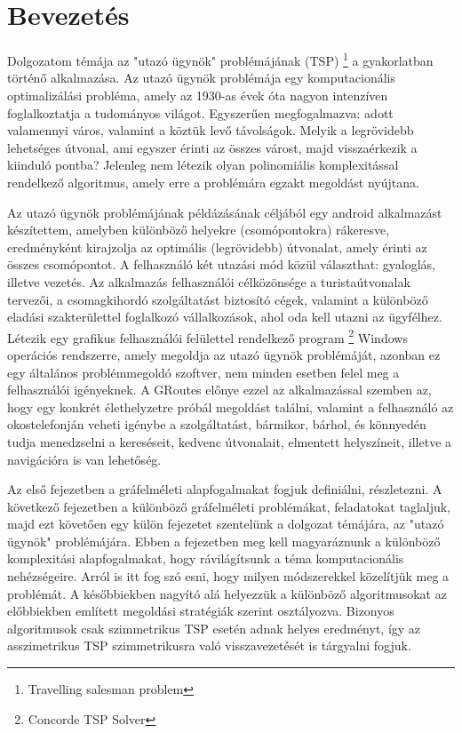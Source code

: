 \chapter{Bevezetés}

Dolgozatom témája az "utazó ügynök" problémájának (TSP)%
\footnote{ %
	Travelling salesman problem
}  %
 a gyakorlatban történő alkalmazása. Az utazó ügynök problémája egy komputacionális optimalizálási probléma, amely az 1930-as évek óta nagyon intenzíven foglalkoztatja a tudományos világot. Egyszerűen megfogalmazva: adott valamennyi város, valamint a köztük levő távolságok. Melyik a legrövidebb lehetséges útvonal, ami egyszer érinti az összes várost, majd visszaérkezik a kiinduló pontba? Jelenleg nem létezik olyan polinomiális komplexitással rendelkező algoritmus, amely erre a problémára egzakt megoldást nyújtana.

Az utazó ügynök problémájának példázásának céljából egy android alkalmazást készítettem, amelyben különböző helyekre (csomópontokra) rákeresve, eredményként kirajzolja az optimális (legrövidebb) útvonalat, amely érinti az összes csomópontot. A felhasználó két utazási mód közül választhat: gyaloglás, illetve vezetés. Az alkalmazás felhasználói célközönsége a turistaútvonalak tervezői, a csomagkihordó szolgáltatást biztosító cégek, valamint a különböző eladási szakterülettel foglalkozó vállalkozások, ahol oda kell utazni az ügyfélhez. Létezik egy grafikus felhasználói felülettel rendelkező program%
\footnote{ %
	Concorde TSP Solver
}  %
 Windows operációs rendszerre, amely megoldja az utazó ügynök problémáját, azonban ez egy általános problémmegoldó szoftver, nem minden esetben felel meg a felhasználói igényeknek. A GRoutes előnye ezzel az alkalmazással szemben az, hogy egy konkrét élethelyzetre próbál megoldást találni, valamint a felhasználó az okostelefonján veheti igénybe a szolgáltatást, bármikor, bárhol, és könnyedén tudja menedzselni a kereséseit, kedvenc útvonalait, elmentett helyszíneit, illetve a navigációra is van lehetőség.

Az első fejezetben a gráfelméleti alapfogalmakat fogjuk definiálni, részletezni. A következő fejezetben a különböző gráfelméleti problémákat, feladatokat taglaljuk, majd ezt követően egy külön fejezetet szentelünk a dolgozat témájára, az "utazó ügynök" problémájára. Ebben a fejezetben meg kell magyaráznunk a különböző komplexitási alapfogalmakat, hogy rávilágítsunk a téma komputacionális nehézségeire. Arról is itt fog szó esni, hogy milyen módszerekkel közelítjük meg a problémát. A későbbiekben nagyító alá helyezzük a különböző algoritmusokat az előbbiekben említett megoldási stratégiák szerint osztályozva. Bizonyos algoritmusok csak szimmetrikus TSP esetén adnak helyes eredményt, így az asszimetrikus TSP szimmetrikusra való visszavezetését is tárgyalni fogjuk.

